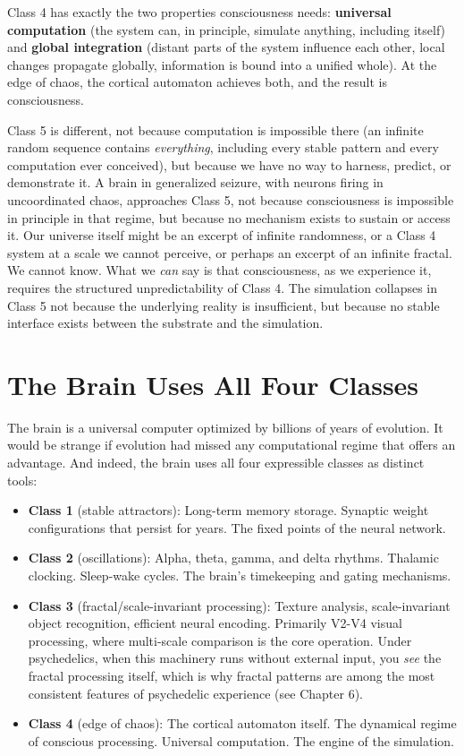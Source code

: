 \documentclass[11pt, twoside, openright]{book}
\begin{document}
Class 4 has exactly the two properties consciousness needs: \textbf{universal computation} (the system can, in principle, simulate anything, including itself) and \textbf{global integration} (distant parts of the system influence each other, local changes propagate globally, information is bound into a unified whole). At the edge of chaos, the cortical automaton achieves both, and the result is consciousness.

Class 5 is different, not because computation is impossible there (an infinite random sequence contains \textit{everything}, including every stable pattern and every computation ever conceived), but because we have no way to harness, predict, or demonstrate it. A brain in generalized seizure, with neurons firing in uncoordinated chaos, approaches Class 5, not because consciousness is impossible in principle in that regime, but because no mechanism exists to sustain or access it. Our universe itself might be an excerpt of infinite randomness, or a Class 4 system at a scale we cannot perceive, or perhaps an excerpt of an infinite fractal. We cannot know. What we \textit{can} say is that consciousness, as we experience it, requires the structured unpredictability of Class 4. The simulation collapses in Class 5 not because the underlying reality is insufficient, but because no stable interface exists between the substrate and the simulation.

\section*{The Brain Uses All Four Classes}

The brain is a universal computer optimized by billions of years of evolution. It would be strange if evolution had missed any computational regime that offers an advantage. And indeed, the brain uses all four expressible classes as distinct tools:

\begin{itemize}
  \item \textbf{Class 1} (stable attractors): Long-term memory storage. Synaptic weight configurations that persist for years. The fixed points of the neural network.
  \item \textbf{Class 2} (oscillations): Alpha, theta, gamma, and delta rhythms. Thalamic clocking. Sleep-wake cycles. The brain's timekeeping and gating mechanisms.
  \item \textbf{Class 3} (fractal/\allowbreak{}scale-invariant processing): Texture analysis, scale-invariant object recognition, efficient neural encoding. Primarily V2-V4 visual processing, where multi-scale comparison is the core operation. Under psychedelics, when this machinery runs without external input, you \textit{see} the fractal processing itself, which is why fractal patterns are among the most consistent features of psychedelic experience (see Chapter 6).
  \item \textbf{Class 4} (edge of chaos): The cortical automaton itself. The dynamical regime of conscious processing. Universal computation. The engine of the simulation.
\end{itemize}
\end{document}
